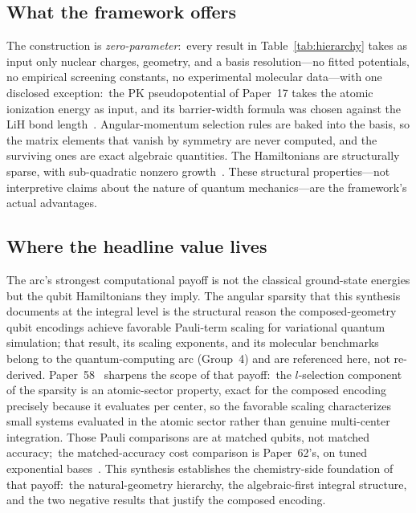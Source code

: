 \documentclass[aps,pra,twocolumn,superscriptaddress,longbibliography]{revtex4-2}
\begin{document}
\subsection{What the framework offers}

The construction is \emph{zero-parameter}:\ every result in
Table~\ref{tab:hierarchy} takes as input only nuclear charges,
geometry, and a basis resolution---no fitted potentials, no empirical
screening constants, no experimental molecular data---with one disclosed
exception:\ the PK pseudopotential of Paper~17 takes the atomic ionization
energy as input, and its barrier-width formula was chosen against the LiH
bond length~\cite{loutey_paper11, loutey_paper17}.  Angular-momentum
selection rules are baked into the basis, so the matrix elements that
vanish by symmetry are never computed, and the surviving ones are exact
algebraic quantities.  The Hamiltonians are structurally sparse, with
sub-quadratic nonzero growth~\cite{loutey_fci_atoms}.  These structural
properties---not interpretive claims about the nature of quantum
mechanics---are the framework's actual advantages.

\subsection{Where the headline value lives}

The arc's strongest computational payoff is not the classical
ground-state energies but the qubit Hamiltonians they imply.  The
angular sparsity that this synthesis documents at the integral level is
the structural reason the composed-geometry qubit encodings achieve
favorable Pauli-term scaling for variational quantum simulation; that
result, its scaling exponents, and its molecular benchmarks belong to
the quantum-computing arc (Group~4) and are referenced here, not
re-derived.  Paper~58~\cite{loutey_paper58} sharpens the scope of that
payoff:\ the $l$-selection component of the sparsity is an atomic-sector
property, exact for the composed encoding precisely because it evaluates
per center, so the favorable scaling characterizes small systems
evaluated in the atomic sector rather than genuine multi-center
integration.  Those Pauli comparisons are at matched qubits, not matched
accuracy;\ the matched-accuracy cost comparison is Paper~62's, on tuned
exponential bases~\cite{loutey_paper62}.  This synthesis establishes the chemistry-side foundation of
that payoff:\ the natural-geometry hierarchy, the algebraic-first
integral structure, and the two negative results that justify the
composed encoding.
\end{document}
